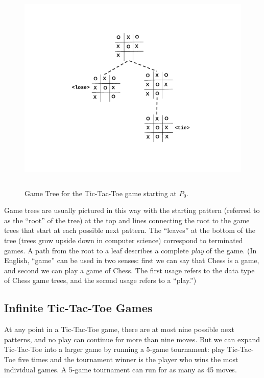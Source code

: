 \begin{definition}
\begin{figure}[htbp]
\centering
\includegraphics[height=4in]{figures/endgame.pdf}
\caption{Game Tree for the Tic-Tac-Toe game starting at $P_0$.}
\label{fig:endgame}
\end{figure}

Game trees are usually pictured in this way with the starting pattern
(referred to as the ``root'' of the tree) at the top and lines connecting
the root to the game trees that start at each
possible next pattern.  The ``leaves'' at the bottom of the tree (trees
grow upside down in computer science) correspond to terminated games.  A
path from the root to a leaf describes a complete \emph{play} of the game.
(In English, ``game'' can be used in two senses: first we can say that
Chess is a game, and second we can play a game of Chess.  The first usage
refers to the data type of Chess game trees, and the second usage refers to
a ``play.'')

\subsection{Infinite Tic-Tac-Toe Games}

At any point in a Tic-Tac-Toe game, there are at most nine possible
next patterns, and no play can continue for more than nine moves.  But
we can expand Tic-Tac-Toe into a larger game by running a 5-game
tournament: play Tic-Tac-Toe five times and the tournament winner is
the player who wins the most individual games.  A 5-game tournament
can run for as many as 45 moves.


\end{definition}
